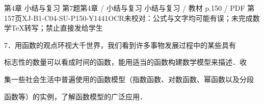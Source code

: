 \begin{bankitem}{第4章 小结与复习 第7题}{第4章 / 小结与复习 小结与复习 / 教材 p.150 / PDF 第157页}{XJ-B1-C04-SU-P150-Y1441}{OCR未校对：公式与文字均可能有误；未完成数学TeX转写；禁止直接发给学生}
\begin{ocrdraft}
\par
7．用函数的观点环视大千世界，我们看到许多事物发展过程中的某些具有
\par
标志性的数量可以看成时间的函数，能用适当的函数构建数学模型来描述．收
\par
集一些社会生活中普遍使用的函数模型（指数函数、对数函数、幂函数以及分段
\par
函数等）的实例，了解函数模型的广泛应用．
\end{ocrdraft}
\end{bankitem}
